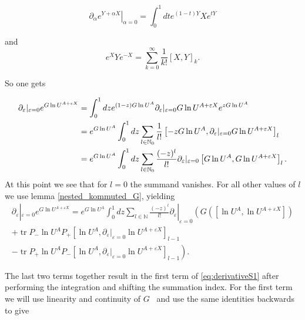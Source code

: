 \documentclass[b5paper,draft,openbib,12pt]{memoir}
\DeclareMathOperator{\tr}{tr}
\begin{document}
\begin{equation}\label{Duhamel}
\partial_{\alpha}\left. e^{Y+\alpha X}\right|_{\alpha=0} = \int_0^1 d t e^{(1-t) Y} X e^{t Y}\tag{Duhamel's formula}
\end{equation}

and
\begin{equation}\tag{Hadamard's formula}\label{Hadamard}
e^{X}Ye^{-X}=\sum_{k=0}^\infty \frac{1}{k!} [X,Y]_k.
\end{equation}

So one gets

\begin{align}\label{proof:duhamelApplied}
\partial_\varepsilon |_{\varepsilon=0} e^{G \ln U^{A+\varepsilon X}} &= \int_0^1 d z e^{(1-z) G \ln U^A} \partial_\varepsilon |_{\varepsilon=0} G \ln U^{A+\varepsilon X} e^{z G \ln U^A}\\\notag
&=e^{G \ln U^A} \int_0^1 d z \sum_{l\in\mathbb{N}_0} \frac{1}{l!} \left[ - z G \ln U^A, \partial_\varepsilon |_{\varepsilon=0} G \ln U^{A+\varepsilon X} \right]_l\\\notag
&=e^{G \ln U^A} \int_0^1 d z \sum_{l\in\mathbb{N}_0} \frac{(-z)^l}{l!} \partial_\varepsilon |_{\varepsilon=0} \left[  G \ln U^A,  G \ln U^{A+\varepsilon X} \right]_l.
\end{align}
At this point we see that for \(l=0\) the summand vanishes. For all other values of \(l\) we use lemma \ref{nested_kommuted_G}, yielding
\begin{multline}
\partial_\varepsilon |_{\varepsilon=0} e^{G \ln U^{A+\varepsilon X}}= 
e^{G \ln U^A} \int_0^1 d z \sum_{l\in\mathbb{N}} \frac{(-z)^l}{l!} \partial_\varepsilon |_{\varepsilon=0} \left( G\left(\left[ \ln U^A, \ln U^{A+\varepsilon X}\right]\right) \right.\\
+\tr P_- \ln U^A P_+ \left[ \ln U^A, \partial_\varepsilon |_{\varepsilon=0} \ln U^{A+\varepsilon X}\right]_{l-1}\\
\left. - \tr P_+ \ln U^A P_- \left[ \ln U^A, \partial_\varepsilon |_{\varepsilon=0} \ln U^{A+\varepsilon X}\right]_{l-1}\right).
\end{multline}

The last two terms together result in the first term of \eqref{eq:derivativeS1} after performing the integration and shifting the summation
index. For the first term we will use linearity and continuity of \(G\)   ~and use the same identities backwards to give
\end{document}
